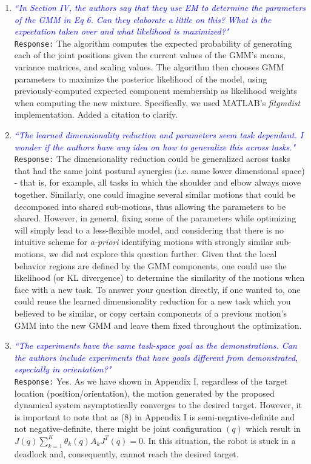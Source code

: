 \documentclass{article}
\begin{document}
\begin{enumerate}
\item \textcolor{blue}{\textit{``In Section IV, the authors say that they use EM to determine the parameters of the GMM in Eq 6. Can
they elaborate a little on this? What is the expectation taken over and what likelihood is maximized?"}}\\
\texttt{Response:} \small The algorithm computes the expected probability of generating each of the joint positions given the current values of the GMM's means, variance matrices, and scaling values. The algorithm then chooses GMM parameters to maximize the posterior likelihood of the model, using previously-computed expected component membership as likelihood weights when computing the new mixture. Specifically, we used MATLAB's \textit{fitgmdist} implementation. Added a citation to clarify.\\

\item \textcolor{blue}{\textit{``The learned dimensionality reduction and parameters seem task dependant. I wonder if the authors
have any idea on how to generalize this across tasks."}}\\
\texttt{Response:} \small The dimensionality reduction could be generalized across tasks that had the same joint postural synergies (i.e. same lower dimensional space) - that is, for example, all tasks in which the shoulder and elbow always move together. Similarly, one could imagine several similar motions that could be decomposed into shared sub-motions, thus allowing the parameters to be shared. However, in general, fixing some of the parameters while optimizing will simply lead to a less-flexible model, and considering that there is no intuitive scheme for \textit{a-priori} identifying motions with strongly similar sub-motions, we did not explore this question further. Given that the local behavior regions are defined by the GMM components, one could use the likelihood (or KL divergence) to determine the similarity of the motions when face with a new task. To answer your question directly, if one wanted to, one could reuse the learned dimensionality reduction for a new task which you believed to be similar, or copy certain components of a previous motion's GMM into the new GMM and leave them fixed throughout the optimization.

\item \textcolor{blue}{\textit{``The experiments have the same task-space goal as the
demonstrations. Can the authors include experiments that have goals
different from demonstrated, especially in orientation?"}}\\
\texttt{Response:} \small Yes. As we have shown in Appendix I, regardless of the target location (position/orientation), the motion generated by the proposed dynamical system asymptotically converges to the desired target. However, it is important to note that as (8) in Appendix I is semi-negative-definite and not negative-definite, there might be joint configuration $ (q )$ which result in $ J(q)\sum\limits_{k=1}^{K}\theta_k(q)A_kJ^T(q)=0 $. In this situation, the robot is stuck in a deadlock and, consequently, cannot reach the desired target. 


\end{enumerate}
\end{document}
